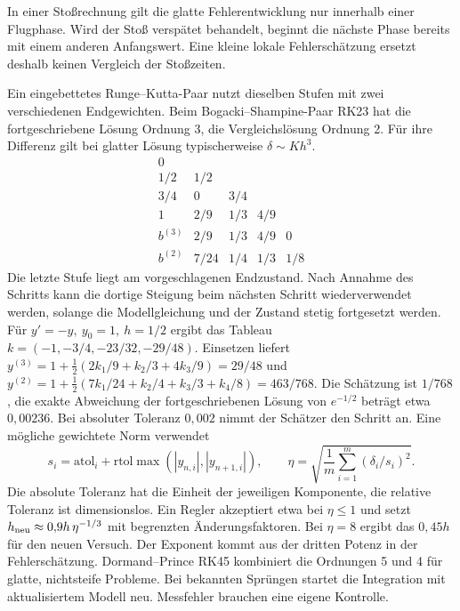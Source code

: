 In einer Stoßrechnung gilt die glatte Fehlerentwicklung nur innerhalb einer Flugphase. Wird der Stoß verspätet behandelt, beginnt die nächste Phase bereits mit einem anderen Anfangswert. Eine kleine lokale Fehlerschätzung ersetzt deshalb keinen Vergleich der Stoßzeiten.

Ein eingebettetes Runge--Kutta-Paar nutzt dieselben Stufen mit zwei verschiedenen Endgewichten. Beim Bogacki--Shampine-Paar RK23 hat die fortgeschriebene Lösung Ordnung 3, die Vergleichslösung Ordnung 2. Für ihre Differenz gilt bei glatter Lösung typischerweise \(\delta\sim K h^3\).
\[
 \begin{array}{c|cccc}
 0&&&&\\
 1/2&1/2&&&\\
 3/4&0&3/4&&\\
 1&2/9&1/3&4/9&\\ \hline
 b^{(3)}&2/9&1/3&4/9&0\\
 b^{(2)}&7/24&1/4&1/3&1/8
 \end{array}
\]
Die letzte Stufe liegt am vorgeschlagenen Endzustand. Nach Annahme des Schritts kann die dortige Steigung beim nächsten Schritt wiederverwendet werden, solange die Modellgleichung und der Zustand stetig fortgesetzt werden.
Für \(y'=-y,\ y_0=1,\ h=1/2\) ergibt das Tableau \(k=(-1,-3/4,-23/32,-29/48)\). Einsetzen liefert \(y^{(3)}=1+\tfrac12(2k_1/9+k_2/3+4k_3/9)=29/48\) und \(y^{(2)}=1+\tfrac12(7k_1/24+k_2/4+k_3/3+k_4/8)=463/768\). Die Schätzung ist \(1/768\), die exakte Abweichung der fortgeschriebenen Lösung von \(e^{-1/2}\) beträgt etwa \(0{,}00236\). Bei absoluter Toleranz \(0{,}002\) nimmt der Schätzer den Schritt an.
Eine mögliche gewichtete Norm verwendet
\[
 s_i=\mathrm{atol}_i+\mathrm{rtol}\max(|y_{n,i}|,|y_{n+1,i}|),\qquad
 \eta=\sqrt{\frac1m\sum_{i=1}^m(\delta_i/s_i)^2}.
\]
Die absolute Toleranz hat die Einheit der jeweiligen Komponente, die relative Toleranz ist dimensionslos. Ein Regler akzeptiert etwa bei \(\eta\le1\) und setzt \(h_{\rm neu}\approx0{,}9h\,\eta^{-1/3}\) mit begrenzten Änderungsfaktoren. Bei \(\eta=8\) ergibt das \(0{,}45h\) für den neuen Versuch. Der Exponent kommt aus der dritten Potenz in der Fehlerschätzung.
Dormand--Prince RK45 kombiniert die Ordnungen 5 und 4 für glatte, nichtsteife Probleme. Bei bekannten Sprüngen startet die Integration mit aktualisiertem Modell neu. Messfehler brauchen eine eigene Kontrolle.

